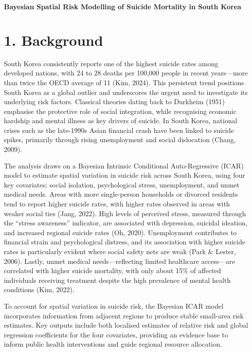 \documentclass[11pt]{article}
\begin{document}
	
	\begin{center}
		\LARGE\textbf{Bayesian Spatial Risk Modelling of Suicide Mortality in South Korea}
	\end{center}
	
	\section*{1. Background}
	
	South Korea consistently reports one of the highest suicide rates among developed nations, with 24 to 28 deaths per 100,000 people in recent years—more than twice the OECD average of 11 (Kim, 2024). This persistent trend positions South Korea as a global outlier and underscores the urgent need to investigate its underlying risk factors. Classical theories dating back to Durkheim (1951) emphasise the protective role of social integration, while recognising economic hardship and mental illness as key drivers of suicide. In South Korea, national crises such as the late-1990s Asian financial crash have been linked to suicide spikes, primarily through rising unemployment and social dislocation (Chang, 2009).
	
	The analysis draws on a Bayesian Intrinsic Conditional Auto-Regressive (ICAR) model to estimate spatial variation in suicide risk across South Korea, using four key covariates: social isolation, psychological stress, unemployment, and unmet medical needs. Areas with more single-person households or divorced residents tend to report higher suicide rates, with higher rates observed in areas with weaker social ties (Jang, 2022). High levels of perceived stress, measured through the “stress awareness” indicator, are associated with depression, suicidal ideation, and increased regional suicide rates (Oh, 2020). Unemployment contributes to financial strain and psychological distress, and its association with higher suicide rates is particularly evident where social safety nets are weak (Park \& Lester, 2006). Lastly, unmet medical needs—reflecting limited healthcare access—are correlated with higher suicide mortality, with only about 15\% of affected individuals receiving treatment despite the high prevalence of mental health conditions (Kim, 2022).
	
	To account for spatial variation in suicide risk, the Bayesian ICAR model incorporates information from adjacent regions to produce stable small-area risk estimates. Key outputs include both localised estimates of relative risk and global regression coefficients for the four covariates, providing an evidence base to inform public health interventions and guide regional resource allocation.
\end{document}
